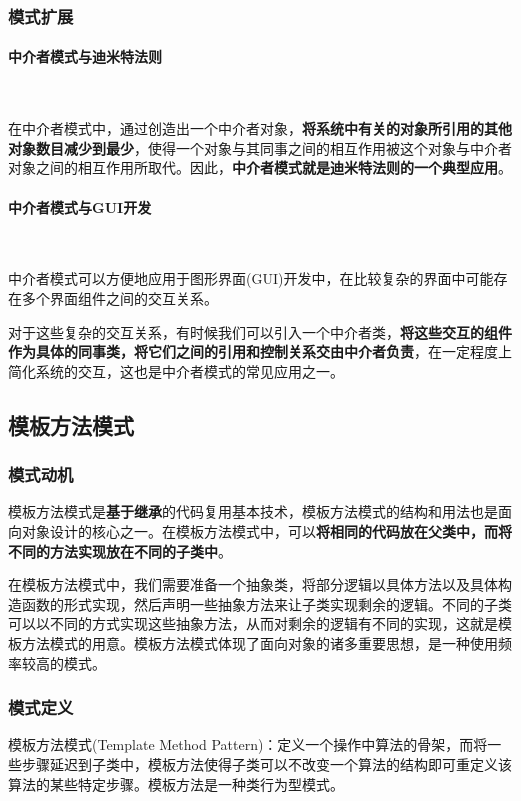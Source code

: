 \subsubsection{模式扩展}
\paragraph*{中介者模式与迪米特法则}~{} \par
在中介者模式中，通过创造出一个中介者对象，\textbf{将系统中有关的对象所引用的其他对象数目减少到最少}，使得一个对象与其同事之间的相互作用被这个对象与中介者对象之间的相互作用所取代。因此，\textbf{中介者模式就是迪米特法则的一个典型应用}。

\paragraph*{中介者模式与GUI开发}~{} \par
中介者模式可以方便地应用于图形界面(GUI)开发中，在比较复杂的界面中可能存在多个界面组件之间的交互关系。

对于这些复杂的交互关系，有时候我们可以引入一个中介者类，\textbf{将这些交互的组件作为具体的同事类，将它们之间的引用和控制关系交由中介者负责}，在一定程度上简化系统的交互，这也是中介者模式的常见应用之一。


\subsection{模板方法模式}

\subsubsection{模式动机}
模板方法模式是\textbf{基于继承}的代码复用基本技术，模板方法模式的结构和用法也是面向对象设计的核心之一。在模板方法模式中，可以\textbf{将相同的代码放在父类中，而将不同的方法实现放在不同的子类中}。

在模板方法模式中，我们需要准备一个抽象类，将部分逻辑以具体方法以及具体构造函数的形式实现，然后声明一些抽象方法来让子类实现剩余的逻辑。不同的子类可以以不同的方式实现这些抽象方法，从而对剩余的逻辑有不同的实现，这就是模板方法模式的用意。模板方法模式体现了面向对象的诸多重要思想，是一种使用频率较高的模式。

\subsubsection{模式定义}
模板方法模式(Template Method Pattern)：定义一个操作中算法的骨架，而将一些步骤延迟到子类中，模板方法使得子类可以不改变一个算法的结构即可重定义该算法的某些特定步骤。模板方法是一种类行为型模式。

